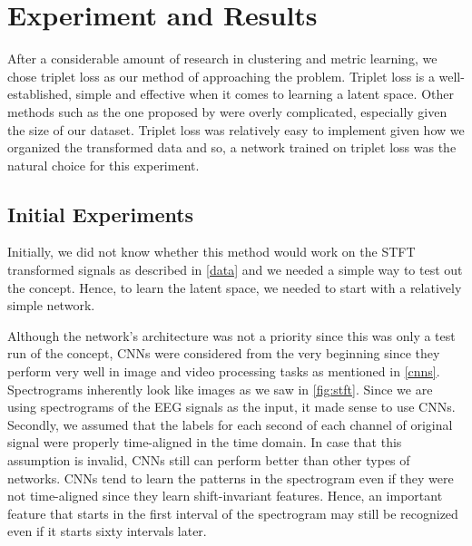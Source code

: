 \chapter{Experiment and Results}
\label{expres}

After a considerable amount of research in clustering and metric learning, we chose triplet loss as our method of approaching the problem. Triplet loss is a  well-established, simple and effective when it comes to learning a latent space. Other methods such as the one proposed by \citet{lifted_structure_embedding} were overly complicated, especially given the size of our dataset. Triplet loss was relatively easy to implement given how we organized the transformed data and so, a network trained on triplet loss was the natural choice for this experiment. 

\section{Initial Experiments}

Initially, we did not know whether this method would work on the STFT transformed signals as described in \cref{data} and we needed a simple way to test out the concept. Hence, to learn the latent space, we needed to start with a relatively simple network. 

Although the network's architecture was not a priority since this was only a test run of the concept, CNNs were considered from the very beginning since they perform very well in image and video processing tasks as mentioned in \cref{cnns}. Spectrograms inherently look like images as we saw in \cref{fig:stft}. Since we are using spectrograms of the EEG signals as the input, it made sense to use CNNs. Secondly, we assumed that the labels for each second of each channel of original signal were properly time-aligned in the time domain. In case that this assumption is invalid, CNNs still can perform better than other types of networks. CNNs tend to learn the patterns in the spectrogram even if they were not time-aligned since they learn shift-invariant features. Hence, an important feature that starts in the first interval of the spectrogram may still be recognized even if it starts sixty intervals later.


